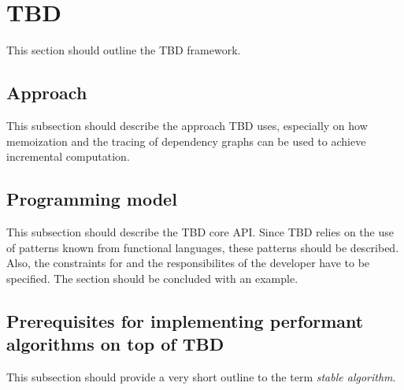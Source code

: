 \section{TBD}
This section should outline the TBD framework. 

\subsection{Approach}
This subsection should describe the approach TBD uses, especially on how memoization and the tracing of dependency graphs can be used to achieve incremental computation. 

\subsection{Programming model}
This subsection should describe the TBD core API. Since TBD relies on the use of patterns known from functional languages, these patterns should be described. Also, the constraints for and the responsibilites of the developer have to be specified. The section should be concluded with an example. 

\subsection{Prerequisites for implementing performant algorithms on top of TBD}
This subsection should provide a very short outline to the term \textit{stable algorithm}. 